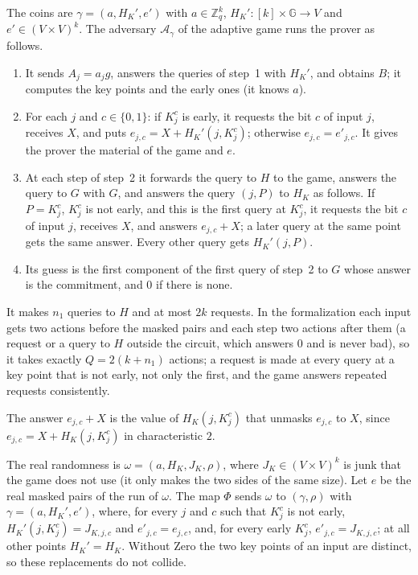 \begin{definition}
  \label{def:co-adv}
  \leanok
  The coins are $\gamma = (a, H_K', e')$ with $a \in \mathbb{Z}_q^k$, $H_K' : [k] \times \mathbb{G} \to V$
  and $e' \in (V \times V)^k$. The adversary $\mathcal{A}_\gamma$ of the adaptive game runs the
  prover as follows.
  \begin{enumerate}
    \item It sends $A_j = a_j g$, answers the queries of step~1 with $H_K'$, and obtains $B$; it
    computes the key points and the early ones (it knows $a$).
    \item For each $j$ and $c \in \{0, 1\}$: if $K^c_j$ is early, it requests the bit $c$ of input
    $j$, receives $X$, and puts $e_{j,c} = X + H_K'(j, K^c_j)$; otherwise $e_{j,c} = e'_{j,c}$. It
    gives the prover the material of the game and $e$.
    \item At each step of step~2 it forwards the query to $H$ to the game, answers the query to $G$
    with $G$, and answers the query $(j, P)$ to $H_K$ as follows. If $P = K^c_j$, $K^c_j$ is not
    early, and this is the first query at $K^c_j$, it requests the bit $c$ of input $j$, receives
    $X$, and answers $e_{j,c} + X$; a later query at the same point gets the same answer. Every
    other query gets $H_K'(j, P)$.
    \item Its guess is the first component of the first query of step~2 to $G$ whose answer is the
    commitment, and $0$ if there is none.
  \end{enumerate}
  It makes $n_1$ queries to $H$ and at most $2k$ requests. In the formalization each input gets two
  actions before the masked pairs and each step two actions after them (a request or a query to $H$
  outside the circuit, which answers $0$ and is never bad), so it takes exactly $Q = 2(k + n_1)$
  actions; a request is made at every query at a key point that is not early, not only the first,
  and the game answers repeated requests consistently.
\end{definition}

The answer $e_{j,c} + X$ is the value of $H_K(j, K^c_j)$ that unmasks $e_{j,c}$ to $X$, since
$e_{j,c} = X + H_K(j, K^c_j)$ in characteristic $2$.

\begin{definition}
  \label{def:co-map}
  \leanok
  The real randomness is $\omega = (a, H_K, J_K, \rho)$, where $J_K \in (V \times V)^k$ is junk that
  the game does not use (it only makes the two sides of the same size). Let $e$ be the real masked
  pairs of the run of $\omega$. The map $\Phi$ sends $\omega$ to $(\gamma, \rho)$ with $\gamma = (a,
  H_K', e')$, where, for every $j$ and $c$ such that $K^c_j$ is not early,
  $H_K'(j, K^c_j) = J_{K, j, c}$ and $e'_{j,c} = e_{j,c}$, and, for every early $K^c_j$,
  $e'_{j,c} = J_{K, j, c}$; at all other points $H_K' = H_K$. Without $\mathrm{Zero}$ the two key
  points of an input are distinct, so these replacements do not collide.
\end{definition}

